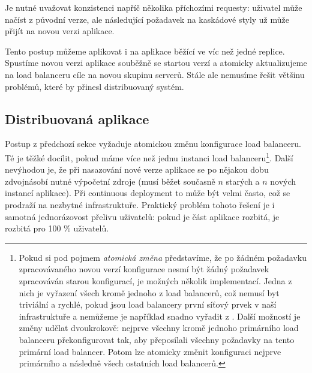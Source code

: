             Je nutné uvažovat konzistenci napříč několika příchozími \HTTP requesty: uživatel může načíst \HTML z původní verze, ale následující \HTTP požadavek na kaskádové styly už může přijít na novou verzi aplikace.

            Tento postup můžeme aplikovat i na aplikace běžící ve víc než jedné replice. Spustíme novou verzi aplikace souběžně se startou verzí a atomicky aktualizujeme na load balanceru cíle na novou skupinu serverů. Stále ale nemusíme řešit většinu problémů, které by přinesl distribuovaný systém.

        \subsection*{Distribuovaná aplikace}
            \label{distributed-apps}
            Postup z předchozí sekce vyžaduje atomickou změnu konfigurace load balanceru. Té je těžké docílit, pokud máme více než jednu instanci load balanceru\footnote{Pokud si pod pojmem \textit{atomická změna} představíme, že po žádném požadavku zpracovávaného novou verzí konfigurace nesmí být žádný požadavek zpracováván starou konfigurací, je možných několik implementací. Jedna z nich je vyřazení všech kromě jednoho z load balancerů, což nemusí byt triviální a rychlé, pokud jsou load balancery první síťový prvek v naší infrastruktuře a nemůžeme je například snadno vyřadit z . Další možností je změny udělat dvoukrokově: nejprve všechny kromě jednoho primárního load balanceru překonfigurovat tak, aby přeposílali všechny požadavky na tento primární load balancer. Potom lze atomicky změnit konfiguraci nejprve primárního a následně všech ostatních load balancerů.}. Další nevýhodou je, že při nasazování nové verze aplikace se po nějakou dobu zdvojnásobí nutné výpočetní zdroje (musí běžet současně $n$ starých a $n$ nových instancí aplikace). Při continuous deployment to může být velmi často, což se prodraží na nezbytné infrastruktuře. Praktický problém tohoto řešení je i samotná jednorázovost přelivu uživatelů: pokud je část aplikace rozbitá, je rozbitá pro 100 \% uživatelů.

